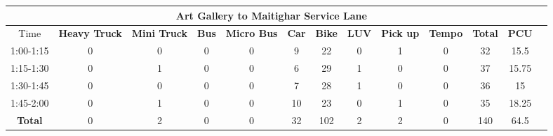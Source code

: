 \begin{landscape}
\begin{table}[h!]
\vspace{0.5cm}
\begin{tabular}{|c|c|c|c|c|c|c|c|c|c|c|c|c|}
    \hline
    \multicolumn{12}{|c|}{\textbf{Art Gallery to Maitighar Service Lane}} \\
    \hline
        Time & \textbf{Heavy Truck} & \textbf{Mini Truck} & \textbf{Bus} & \textbf{Micro Bus} & \textbf{Car} & \textbf{Bike} & \textbf{LUV} & \textbf{Pick up} & \textbf{Tempo} & \textbf{\textbf{Total}} & \textbf{PCU} \\
    \hline
1:00-1:15	&0	&0	&0	&0	&9	&22	&0	&1	&0	&32	&15.5 \\ \hline
1:15-1:30	&0	&1	&0	&0	&6	&29	&1	&0	&0	&37	&15.75 \\ \hline
1:30-1:45	&0	&0	&0	&0	&7	&28	&1	&0	&0	&36	&15 \\ \hline
1:45-2:00	&0	&1	&0	&0	&10	&23	&0	&1	&0	&35	&18.25 \\ \hline
\textbf{Total}	&0	&2	&0	&0	&32	&102	&2	&2	&0	&140	&64.5 \\ \hline

\end{tabular}

\end{table}
\end{landscape}



